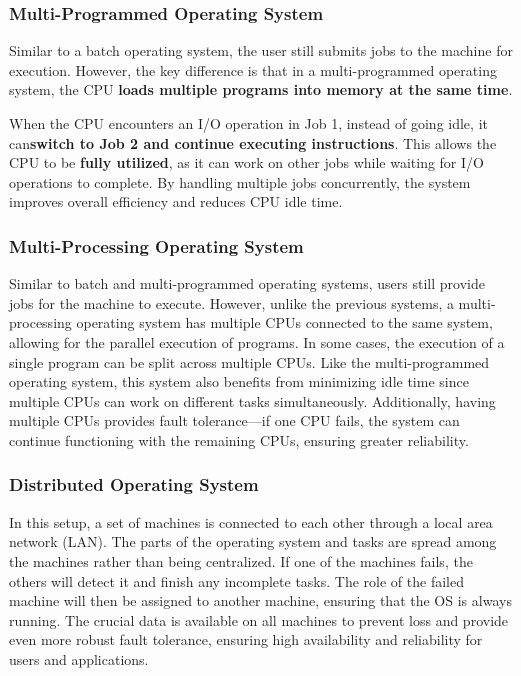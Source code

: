 \subsubsection{Multi-Programmed Operating System}
Similar to a batch operating system, the user still submits jobs to the machine for execution. However, the key difference is that in a multi-programmed 
operating system, the CPU \textbf{loads multiple programs into memory at the same time}.

When the CPU encounters an I/O operation in Job 1, instead of going idle, it can\textbf{switch to Job 2 and continue executing instructions}. 
This allows the CPU to be \textbf{fully utilized}, as it can work on other jobs while waiting for I/O operations to complete. 
By handling multiple jobs concurrently, the system improves overall efficiency and reduces CPU idle time.
\subsubsection{Multi-Processing Operating System}
Similar to batch and multi-programmed operating systems, users still provide jobs for the machine to execute. However, unlike the previous systems, a 
multi-processing operating system has multiple CPUs connected to the same system, allowing for the parallel execution of programs. In some cases, 
the execution of a single program can be split across multiple CPUs.
Like the multi-programmed operating system, this system also benefits from minimizing idle time since multiple CPUs can work on different tasks simultaneously. 
Additionally, having multiple CPUs provides fault tolerance—if one CPU fails, the system can continue functioning with the remaining CPUs, ensuring greater reliability.
\subsubsection{Distributed Operating System}
In this setup, a set of machines is connected to each other through a local area network (LAN). The parts of the operating system and tasks are spread among the machines 
rather than being centralized. If one of the machines fails, the others will detect it and finish any incomplete tasks. The role of the failed machine will then be assigned to 
another machine, ensuring that the OS is always running. The crucial data is available on all machines to prevent loss and provide even more robust fault tolerance, ensuring high 
availability and reliability for users and applications.
